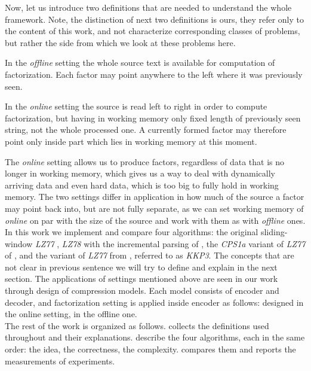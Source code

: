 Now, let us introduce two definitions that are needed to understand the whole framework. Note, the distinction of next two definitions is ours, they refer only to the content of this work, and not characterize corresponding classes of problems, but rather the side from which we look at these problems here. 
\begin{definition}
\label{def:offline-problem}
    In the \emph{offline} setting the whole source text is available for computation of factorization. Each factor may point anywhere to the left where it was previously seen.
\end{definition}

\begin{definition}
\label{def:online-problem}
    In the \emph{online} setting the source is read left to right in order to compute factorization, but having in working memory only fixed length of previously seen string, not the whole processed one. A currently formed factor may therefore point only inside part which lies in working memory at this moment.
\end{definition}
\noindent The \emph{online} setting allows us to produce factors, regardless of data that is no longer in working memory, which gives us a way to deal with dynamically arriving data and even hard data, which is too big to fully hold in working memory. The two settings differ in application in how much of the source a factor may point back into, but are not fully separate, as we can set working memory of \emph{online} on par with the size of the source and work with them as with \emph{offline} ones.
\\

In this work we implement and compare four algorithms: the original sliding-window \emph{LZ77} \cite{ziv1977}, \emph{LZ78} with the incremental parsing of \cite{ziv1978}, the \emph{CPS1a} variant of \emph{LZ77} of \cite{chen2008}, and the variant of \emph{LZ77} from \cite{kkp2012}, referred to as \emph{KKP3}. The concepts that are not clear in previous sentence we will try to define and explain in the next section.
The applications of settings mentioned above are seen in our work through design of compression models. Each model consists of encoder and decoder, and factorization setting is applied inside encoder as follows: \cite{ziv1977, ziv1978} designed in the online setting, \cite{chen2008, kkp2012} in the offline one. 
\\

The rest of the work is organized as follows.  collects the definitions used throughout and their explanations.  describe the four algorithms, each in the same order: the idea, the correctness, the complexity.  compares them and reports the measurements of experiments.

